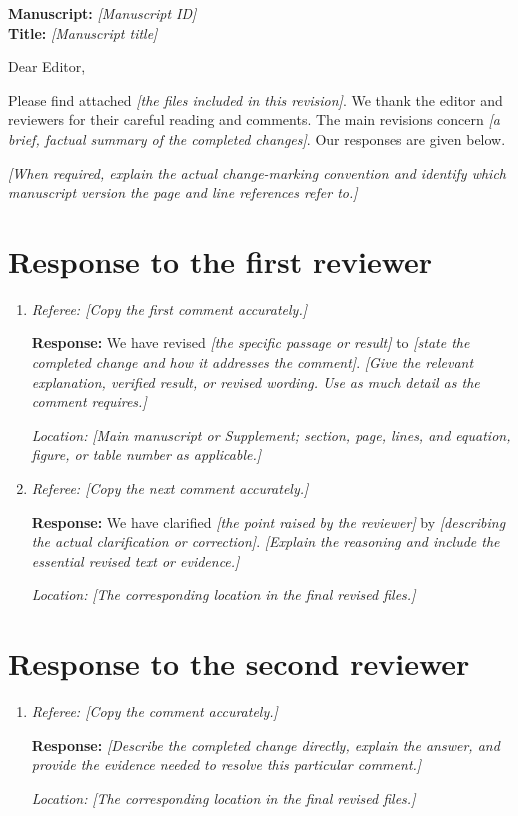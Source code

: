\documentclass[preprint,11pt,sort&compress,square]{elsarticle}
\newcommand{\Placeholder}[1]{\textit{[#1]}}
\newcommand{\Response}{\medskip\noindent\textbf{Response:} }
\newcommand{\Where}[1]{\par\smallskip\noindent\textit{Location:} #1\par\medskip}
\begin{document}
\setlength{\baselineskip}{15pt}

\noindent\textbf{Manuscript:} \Placeholder{Manuscript ID}\\
\textbf{Title:} \Placeholder{Manuscript title}
\bigskip

\noindent Dear Editor,

Please find attached \Placeholder{the files included in this revision}.
We thank the editor and reviewers for their careful reading and comments.
The main revisions concern \Placeholder{a brief, factual summary of the completed changes}.
Our responses are given below.

\Placeholder{When required, explain the actual change-marking convention and identify
which manuscript version the page and line references refer to.}

\section{Response to the first reviewer}
\begin{enumerate}

\item \emph{Referee: \Placeholder{Copy the first comment accurately.}}

\Response We have revised \Placeholder{the specific passage or result} to
\Placeholder{state the completed change and how it addresses the comment}.
\Placeholder{Give the relevant explanation, verified result, or revised wording.
Use as much detail as the comment requires.}
\Where{\Placeholder{Main manuscript or Supplement; section, page, lines, and equation,
figure, or table number as applicable.}}

\item \emph{Referee: \Placeholder{Copy the next comment accurately.}}

\Response We have clarified \Placeholder{the point raised by the reviewer} by
\Placeholder{describing the actual clarification or correction}.
\Placeholder{Explain the reasoning and include the essential revised text or evidence.}
\Where{\Placeholder{The corresponding location in the final revised files.}}

\end{enumerate}

\section{Response to the second reviewer}
\begin{enumerate}

\item \emph{Referee: \Placeholder{Copy the comment accurately.}}

\Response \Placeholder{Describe the completed change directly, explain the answer,
and provide the evidence needed to resolve this particular comment.}
\Where{\Placeholder{The corresponding location in the final revised files.}}

\end{enumerate}

\end{document}

